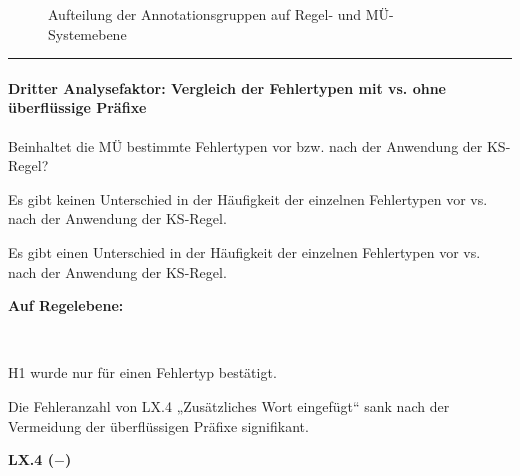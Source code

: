 \begin{figure}
\caption{Aufteilung der Annotationsgruppen auf Regel- und MÜ-Systemebene}
\end{figure}
\hrule
\paragraph*{Dritter Analysefaktor: Vergleich der Fehlertypen mit vs. ohne überflüssige Präfixe}
\begin{description}[font=\normalfont\bfseries]
\item [Fragestellung:] Beinhaltet die MÜ bestimmte Fehlertypen vor bzw. nach der Anwendung der KS-Regel?
\item [H0 --] Es gibt keinen Unterschied in der Häufigkeit der einzelnen Fehlertypen vor vs. nach der Anwendung der KS-Regel.
\item [H1 --] Es gibt einen Unterschied in der Häufigkeit der einzelnen Fehlertypen vor vs. nach der Anwendung der KS-Regel.
\item [Resultat]
\end{description}
\noindent
\parbox[t]{.8\textwidth}{\textbf{Auf Regelebene:}}\\
\parbox[t]{.8\textwidth}{
H1 wurde nur für einen Fehlertyp bestätigt.

Die Fehleranzahl von LX.4 „Zusätzliches Wort eingefügt“ sank nach der Vermeidung der überflüssigen Präfixe signifikant.
}
\parbox[t]{.04\textwidth}{}
\colorbox{smGreen}{\parbox[t]{.15\textwidth}{
\textbf{LX.4 ($-$)}\\
\\
}}

